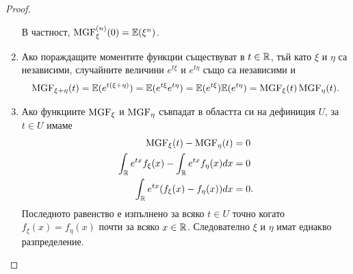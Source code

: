 \documentclass[numbers=endperiod, bibliography=totocnumbered]{scrartcl}
\begin{document}
\begin{proof}
\begin{enumerate}
    В частност, \( \operatorname{MGF}^{(n)}_\xi(0) = \mathbb{E}(\xi^n) \).

    \item Ако пораждащите моментите функции съществуват в \( t \in \mathbb{R} \), тъй като \( \xi \) и \( \eta \) са независими, случайните величини \( e^{t\xi} \) и \( e^{t\eta} \) също са независими и
    \begin{align*}
      \operatorname{MGF}_{\xi + \eta}(t)
      =
      \mathbb{E}(e^{t(\xi + \eta)})
      =
      \mathbb{E}(e^{t\xi} e^{t\eta})
      =
      \mathbb{E}(e^{t\xi}) \mathbb{E}(e^{t\eta})
      =
      \operatorname{MGF}_\xi(t) \operatorname{MGF}_\eta(t).
    \end{align*}

    \item Ако функциите \( \operatorname{MGF}_\xi \) и \( \operatorname{MGF}_\eta \) съвпадат в областта си на дефиниция \( U \), за \( t \in U \) имаме
    \begin{align*}
      \operatorname{MGF}_\xi(t) - \operatorname{MGF}_\eta(t) &= 0
      \\
      \int_{\mathbb{R}} e^{tx} f_\xi(x) - \int_{\mathbb{R}} e^{tx} f_\eta(x) dx &= 0
      \\
      \int_{\mathbb{R}} e^{tx} (f_\xi(x) - f_\eta(x)) dx &= 0.
    \end{align*}
    Последното равенство е изпълнено за всяко \( t \in U \) точно когато \( f_\xi(x) = f_\eta(x) \) почти за всяко \( x \in \mathbb{R} \). Следователно \( \xi \) и \( \eta \) имат еднакво разпределение.
  \end{enumerate}
\end{proof}
\end{document}
